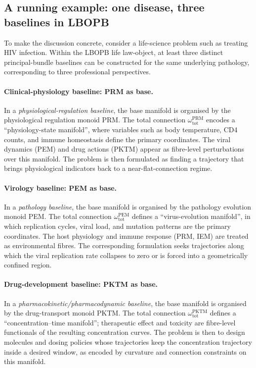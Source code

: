 \documentclass[11pt]{book}
\theoremstyle{plain}
\theoremstyle{definition}
\theoremstyle{remark}
\begin{document}
\subsection{A running example: one disease, three baselines in LBOPB}

To make the discussion concrete, consider a life-science problem such as
treating HIV infection.
Within the LBOPB life law-object, at least three distinct
principal-bundle baselines can be constructed for the same underlying
pathology, corresponding to three professional perspectives.

\paragraph{Clinical-physiology baseline: PRM as base.}
In a \emph{physiological-regulation baseline}, the base manifold is
organised by the physiological regulation monoid PRM.
The total connection \(\omega_{\mathrm{tot}}^{\mathrm{PRM}}\) encodes a
``physiology-state manifold'', where variables such as body temperature,
CD4 counts, and immune homeostasis define the primary coordinates.
The viral dynamics (PEM) and drug actions (PKTM) appear as fibre-level
perturbations over this manifold.
The problem is then formulated as finding a trajectory that brings
physiological indicators back to a near-flat-connection regime.

\paragraph{Virology baseline: PEM as base.}
In a \emph{pathology baseline}, the base manifold is organised by the
pathology evolution monoid PEM.
The total connection \(\omega_{\mathrm{tot}}^{\mathrm{PEM}}\) defines a
``virus-evolution manifold'', in which replication cycles, viral load,
and mutation patterns are the primary coordinates.
The host physiology and immune response (PRM, IEM) are treated as
environmental fibres.
The corresponding formulation seeks trajectories along which the viral
replication rate collapses to zero or is forced into a geometrically
confined region.

\paragraph{Drug-development baseline: PKTM as base.}
In a \emph{pharmacokinetic/pharmacodynamic baseline}, the base manifold
is organised by the drug-transport monoid PKTM.
The total connection \(\omega_{\mathrm{tot}}^{\mathrm{PKTM}}\) defines a
``concentration--time manifold''; therapeutic effect and toxicity are
fibre-level functionals of the resulting concentration curves.
The problem is then to design molecules and dosing policies whose
trajectories keep the concentration trajectory inside a desired window,
as encoded by curvature and connection constraints on this manifold.
\end{document}

